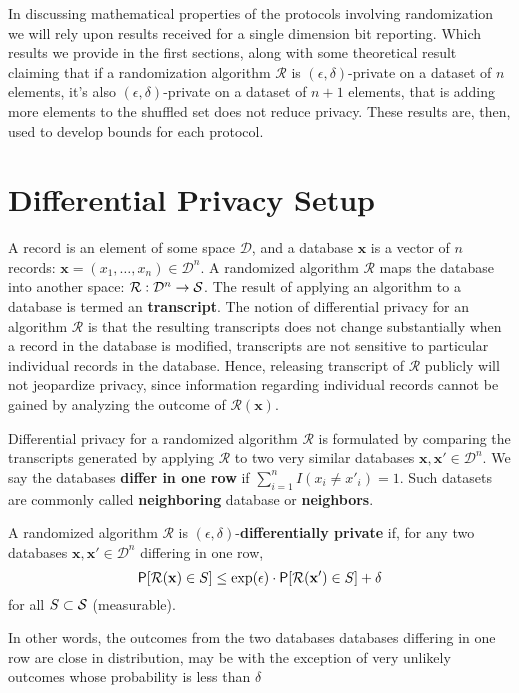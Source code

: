 \documentclass[11pt]{article}
\newcommand{\cR}{\mathcal{R}}
\newcommand{\Dsp}{\mathcal{D}}
\newcommand{\Ssp}{\mathcal{S}}
\newcommand{\xv}{\mathbf{x}}
\begin{document}
In discussing mathematical properties of the protocols involving randomization we will rely upon results received for a single dimension bit reporting.  Which results we provide in the first sections, along with some theoretical result claiming that if a randomization algorithm  $\cR$ is $(\epsilon, \delta)$-private on a dataset of $n$ elements, it's also  $(\epsilon, \delta)$-private on a dataset of $n+1$ elements, that is adding more elements to the shuffled set does not reduce privacy. These results are, then, used to develop bounds for each protocol.

\section{Differential Privacy Setup}
\label{sec:dp}

A record is an element of some space $\Dsp$, and a database $\xv$ is a vector of $n$ records: $\xv = (x_1,\dots,x_n) \in \Dsp^n$.
A randomized algorithm $\cR$ maps the database into another space: $\map{\cR}{\Dsp^n}{\Ssp}$. 
The result of applying an algorithm to a database is termed an \textbf{transcript}.
The notion of differential privacy for an algorithm $\cR$ is that the resulting transcripts does not change substantially when a record in the database is modified,
\ie transcripts are not sensitive to particular individual records in the database.
Hence, releasing transcript of $\cR$ publicly will not jeopardize privacy, since information regarding individual records cannot be gained by analyzing the outcome of $\cR(\xv)$.


Differential privacy for a randomized algorithm $\cR$ is formulated by comparing the transcripts generated by applying $\cR$ to two very similar databases $\xv,\xv' \in \Dsp^n$.
We say the databases \textbf{differ in one row} if 
$\sum_{i=1}^n I(x_i \neq x'_i) = 1$.  
Such datasets are commonly called  \textbf{neighboring} database or  \textbf{neighbors}.
\begin{defn}
A randomized algorithm $\cR$ is $(\epsilon,\delta)$-\textbf{differentially private} if, 
for any two databases $\xv,\xv' \in \Dsp^n$ differing in one row,
\begin{equation}\label{eq:dpdef}
\P[\cR(\xv) \in S] \leq \exp(\epsilon) \cdot \P[\cR(\xv') \in S] + \delta
\end{equation}
for all $S \cont \Ssp$ (measurable).
\end{defn}
In other words, the outcomes from the two databases databases differing in one row are close in distribution, may be with the exception of very unlikely outcomes whose probability is less than $\delta$
\end{document}
